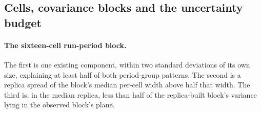\subsection{Cells, covariance blocks and the uncertainty budget}\label{recsec:sixteen-budget}

\paragraph{The sixteen-cell run-period block.} The first is one existing component, within two standard deviations of its own size, explaining at least half of both period-group patterns. The second is a replica spread of the block's median per-cell width above half that width. The third is, in the median replica, less than half of the replica-built block's variance lying in the observed block's plane.

